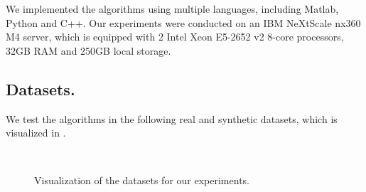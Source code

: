 
We implemented the algorithms using multiple languages, including Matlab, Python and C++. Our experiments were conducted on an IBM NeXtScale nx360 M4 server, which is equipped with 2 Intel Xeon E5-2652 v2 8-core processors, 32GB RAM and 250GB local storage.


\subsection{Datasets.}
We test the algorithms in the following real and synthetic datasets, which is visualized in .


\begin{figure}[h]
     \centering
     ~~
     ~~
     \caption{Visualization of the datasets for our experiments.}
     \label{fig:visualization}
\end{figure}




